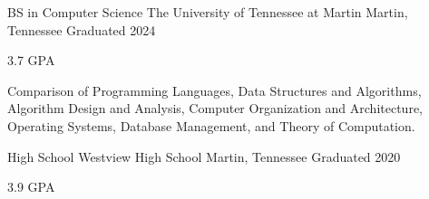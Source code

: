 
\begin{cventries}
  \cventry
    {BS in Computer Science} %
    {The University of Tennessee at Martin} %
    {Martin, Tennessee} %
    {Graduated 2024} %
    {
      \begin{cvitems} %
        \item {3.7 GPA}
        \item {\textbf{\color{custom-darkblue}{Relevant Coursework:}} Comparison of Programming Languages, Data Structures and Algorithms, Algorithm Design and Analysis, Computer Organization and Architecture, Operating Systems, Database Management, and Theory of Computation.} 
      \end{cvitems}
    }
    
  \vspace{1em}
  
  \cventry
    {High School} %
    {Westview High School} %
    {Martin, Tennessee} %
    {Graduated 2020} %
    {
      \begin{cvitems} %
        \item {3.9 GPA}
      \end{cvitems}
    }

\end{cventries}
